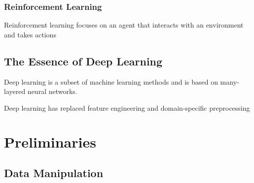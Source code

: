\documentclass[]{article}
\begin{document}
\subsubsection{Reinforcement Learning}
Reinforcement learning focuses on an agent that interacts with an environment and
takes actions

\setcounter{subsection}{6}
\subsection{The Essence of Deep Learning}
Deep learning is a subset of machine learning methods and is based on many-layered
neural networks.

Deep learning has replaced feature engineering and domain-specific preprocessing

\section{Preliminaries}
\subsection{Data Manipulation}

\end{document}
